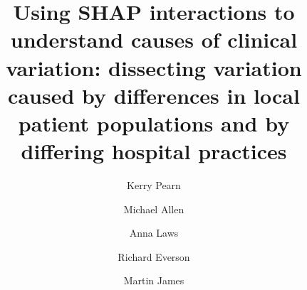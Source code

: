 
\title{Using SHAP interactions to understand causes of clinical variation: dissecting variation caused by differences in local patient populations and by differing hospital practices}


\renewcommand{\thefootnote}{\fnsymbol{footnote}}
\author[*1,2]{Kerry Pearn}
\author[1,2]{Michael Allen}
\author[1,2]{Anna Laws}
\author[4]{Richard Everson}
\author[2,3]{Martin James}

